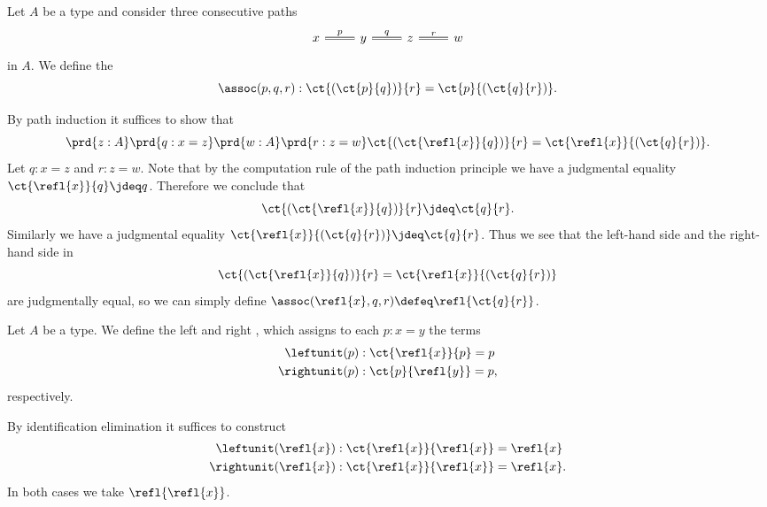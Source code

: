 \begin{defn}\label{defn:id_assoc}
  Let $A$ be a type and consider three consecutive paths
  \begin{equation*}
    \begin{tikzcd}
      x \arrow[r,equals,"p"] & y \arrow[r,equals,"q"] & z \arrow[r,equals,"r"] & w
    \end{tikzcd}
  \end{equation*}
  in $A$. We define the 
  \begin{equation*}
    \assoc(p,q,r) : \ct{(\ct{p}{q})}{r}=\ct{p}{(\ct{q}{r})}.
  \end{equation*}
\end{defn}

\begin{constr}
By path induction it suffices to show that
\begin{equation*}
\prd{z:A}\prd{q:x=z}\prd{w:A}\prd{r:z=w} \ct{(\ct{\refl{x}}{q})}{r}= \ct{\refl{x}}{(\ct{q}{r})}.
\end{equation*}
Let $q:x=z$ and $r:z=w$. Note that by the computation rule of the path induction principle we have a judgmental equality $\ct{\refl{x}}{q}\jdeq q$. Therefore we conclude that
\begin{equation*}
  \ct{(\ct{\refl{x}}{q})}{r}\jdeq \ct{q}{r}.
\end{equation*}
Similarly we have a judgmental equality $\ct{\refl{x}}{(\ct{q}{r})}\jdeq \ct{q}{r}$. Thus we see that the left-hand side and the right-hand side in
\begin{equation*}
  \ct{(\ct{\refl{x}}{q})}{r}=\ct{\refl{x}}{(\ct{q}{r})}
\end{equation*}
are judgmentally equal, so we can simply define $\assoc(\refl{x},q,r)\defeq\refl{\ct{q}{r}}$.
\end{constr}

\begin{defn}\label{defn:id_unit}
Let $A$ be a type. We define the left and right , which assigns to each $p:x=y$ the terms
\begin{align*}
\leftunit(p) & : \ct{\refl{x}}{p}=p \\
\rightunit(p) & : \ct{p}{\refl{y}}=p,
\end{align*}
respectively.
\end{defn}

\begin{constr}
By identification elimination it suffices to construct
\begin{align*}
\leftunit(\refl{x}) & : \ct{\refl{x}}{\refl{x}} = \refl{x} \\
\rightunit(\refl{x}) & : \ct{\refl{x}}{\refl{x}} = \refl{x}.
\end{align*}
In both cases we take $\refl{\refl{x}}$.
\end{constr}

